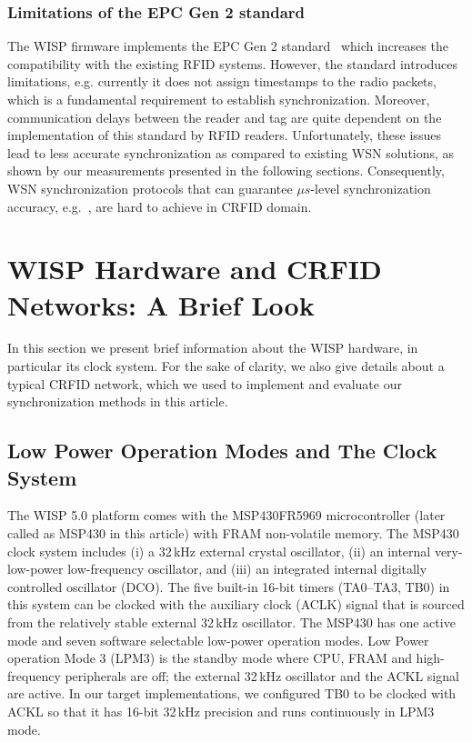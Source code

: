 \documentclass[10pt,journal,compsoc]{IEEEtran}
\begin{document}
\subsubsection{Limitations of the EPC Gen 2 standard} The WISP firmware implements the EPC Gen 2 standard~\cite{epc_gen2} which increases the compatibility with the existing RFID systems. However, the standard introduces limitations, e.g. currently it does not assign timestamps to the radio packets, which is a fundamental requirement to establish synchronization. Moreover, communication delays between the reader and tag are quite dependent on the implementation of this standard by RFID readers. Unfortunately, these issues lead to less accurate synchronization as compared to existing WSN solutions, as shown by our measurements presented in the following sections. Consequently, WSN synchronization protocols that can guarantee $\mu s$-level synchronization accuracy, e.g.~\cite{Maroti2004}, are hard to achieve in CRFID domain.

\section{WISP Hardware and CRFID Networks: A Brief Look}
\label{sec:Clock_Hardware}

In this section we present brief information about the WISP hardware, in particular its clock system. For the sake of clarity, we 
also give details about a typical CRFID network, which we used to implement and evaluate our synchronization methods in this article.

\subsection{Low Power Operation Modes and The Clock System}
\label{subsec:clock_system}

The WISP 5.0 platform comes with the MSP430FR5969 \cite{msp430fr5969_data_sheet} microcontroller (later called as MSP430 in this article) with FRAM non-volatile memory. The MSP430 clock system includes (i) a 32\,kHz external crystal oscillator, (ii) an internal very-low-power low-frequency oscillator, and (iii) an integrated internal digitally controlled oscillator (DCO). The five built-in 16-bit timers (TA0--TA3, TB0) in this system can be clocked with the auxiliary clock (ACLK) signal that is sourced from the relatively stable external 32\,kHz oscillator. The MSP430 has one active mode and seven software selectable low-power operation modes. Low Power operation Mode 3 (LPM3) is the standby mode where CPU, FRAM and high-frequency peripherals are off; the external 32\,kHz oscillator and the ACKL signal are active. In our target implementations, we configured TB0 to be clocked  with ACKL so that it has 16-bit 32\,kHz precision and runs continuously in LPM3 mode.
\end{document}

